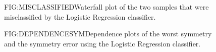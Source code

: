 \begin{figure}[Waterfall Plot of Misclassified Sample]{FIG:MISCLASSIFIED}{Waterfall plot of the two samples that were misclassified by the Logistic Regression classifier.}
    \begin{adjustbox}{width=1\textwidth,height=\textheight,keepaspectratio}
    \end{adjustbox}
\end{figure}

\begin{figure}[Dependence Plots of the Worst Symmetry and the Symmetry Error]{FIG:DEPENDENCESYM}{Dependence plots of the worst symmetry and the symmetry error using the Logistic Regression classifier.}
\end{figure}